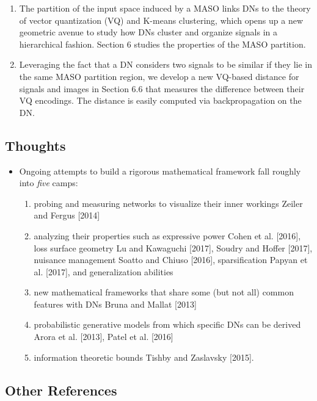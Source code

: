 \documentclass{article}
\begin{document}
\begin{enumerate}
	\item The partition of the input space induced by a MASO links DNs to the theory of vector quantization (VQ) and K-means clustering, which opens up a new geometric avenue to study how DNs cluster and organize signals in a hierarchical fashion. Section 6 studies the properties of the MASO partition.
	\item Leveraging the fact that a DN considers two signals to be similar if they lie in the same MASO partition region, we develop a new VQ-based distance for signals and images in Section 6.6 that measures the difference between their VQ encodings. The distance is easily computed via backpropagation on the DN.
\end{enumerate}


\subsection{Thoughts}

\begin{itemize}
	\item Ongoing attempts to build a rigorous mathematical framework fall roughly into \emph{five} camps:
	\begin{enumerate}
		\item probing and measuring networks to visualize their inner workings Zeiler and Fergus [2014]
		\item analyzing their properties such as expressive power Cohen et al. [2016], loss surface geometry Lu and Kawaguchi [2017], Soudry and Hoffer [2017], nuisance management Soatto and Chiuso [2016], sparsification Papyan et al. [2017], and generalization abilities
		\item new mathematical frameworks that share some (but not all) common features with DNs Bruna and Mallat [2013]
		\item probabilistic generative models from which specific DNs can be derived Arora et al. [2013], Patel et al. [2016]
		\item information theoretic bounds Tishby and Zaslavsky [2015].
	\end{enumerate}
\end{itemize}


\subsection{Other References}
\end{document}
